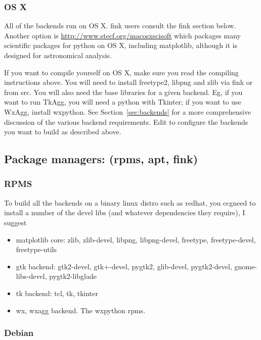 \documentclass[]{book}
\begin{document}
\subsubsection{OS X}
\label{sec:osx}

All of the backends run on OS X.  fink users consult the fink section
below.  Another option is \url{http://www.stecf.org/macosxscisoft}
which packages many scientific packages for python on OS X, including
matplotlib, although it is designed for astronomical analysis.

If you want to compile yourself on OS X, make sure you read the
compiling instructions above.  You will need to install freetype2,
libpng and zlib via fink or from src.  You will also need the base
libraries for a given backend.  Eg, if you want to run TkAgg, you will
need a python with Tkinter; if you want to use WxAgg, install
wxpython.  See Section~\ref{sec:backends} for a more comprehensive
discussion of the various backend requirements.  Edit 
to configure the backends you want to build as described above.


\subsection{Package managers: (rpms, apt, fink)}

\subsubsection{RPMS}
\label{sec:rpms}

To build all the backends on a binary linux distro such as redhat, you
ccgneed to install a number of the devel libs (and whatever dependencies
they require), I suggest
\begin{itemize}
  
\item matplotlib core: zlib, zlib-devel, libpng, libpng-devel,
  freetype, freetype-devel, freetype-utils
  
\item gtk backend: gtk2-devel, gtk+-devel, pygtk2, glib-devel,
  pygtk2-devel, gnome-libs-devel, pygtk2-libglade

\item tk backend: tcl, tk, tkinter

\item wx, wxagg backend.  The wxpython rpms.
\end{itemize}

\subsubsection{Debian}
\label{sec:debian}
\end{document}
